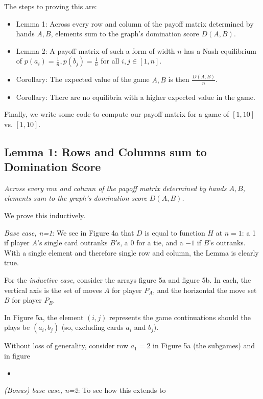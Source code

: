 \documentclass[11pt, oneside]{article} 	%
\begin{document}
The steps to proving this are:

\begin{itemize}
\item Lemma 1: Across every row and column of the payoff matrix determined by hands $A, B$, elements sum to the graph's domination score $D(A,B)$.
\item Lemma 2: A payoff matrix of such a form of width $n$ has a Nash equilibrium of $p(a_i) = \frac{1}{n}, p(b_j) = \frac{1}{n}$ for all $i, j \in [1,n]$.
\item Corollary: The expected value of the game $A, B$ is then $\frac{D(A,B)}{n}$.
\item Corollary: There are no equilibria with a higher expected value in the game.
\end{itemize}

Finally, we write some code to compute our payoff matrix for a game of $[1,10]$ vs. $[1,10]$.

\subsection{Lemma 1: Rows and Columns sum to Domination Score}

\emph{Across every row and column of the payoff matrix determined by hands $A, B$, elements sum to the graph's domination score $D(A,B)$.}

We prove this inductively.

\emph{Base case, n=1}: We see in Figure 4a that $D$ is equal to function $H$ at $n=1$: a 1 if player $A$'s single card outranks $B$'s, a 0 for a tie, and a $-1$ if $B$'s outranks.  With a single element and therefore single row and column, the Lemma is clearly true.

For the \emph{inductive case}, consider the arrays figure 5a and figure 5b.  In each, the vertical axis is the set of moves $A$ for player $P_A$, and the horizontal the move set $B$ for player $P_B$.

In Figure 5a, the element $(i,j)$ represents  the game continuations should the plays be $(a_i, b_j)$ (so, excluding cards $a_i$ and $b_j$). 

Without loss of generality, consider row $a_1 = 2$ in Figure 5a (the subgames) and in figure 
\begin{itemize}
\item
\end{itemize}

\emph{(Bonus) base case, n=2}: To see how this extends to 
\end{document}
